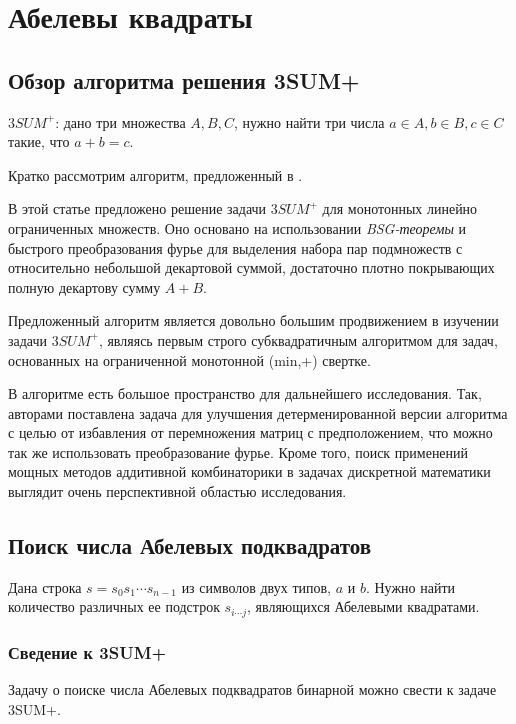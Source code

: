 \section{Абелевы квадраты}

\subsection{Обзор алгоритма решения 3SUM+}

\begin{problem}
$3SUM^+$: дано три множества $A, B, C$, нужно найти три числа $a \in A, b \in B, c \in C$ такие, что $a+b=c$.
\end{problem}


Кратко рассмотрим алгоритм, предложенный в \cite{2}. 

В этой статье предложено решение задачи $3SUM^+$ для монотонных линейно ограниченных множеств. Оно основано на использовании \textit{BSG-теоремы} и быстрого преобразования фурье для выделения набора пар подмножеств с относительно небольшой декартовой суммой, достаточно плотно покрывающих полную декартову сумму $A+B$.

Предложенный алгоритм является довольно большим продвижением в изучении задачи $3SUM^+$, являясь первым строго субквадратичным алгоритмом для задач, основанных на ограниченной монотонной (min,+) свертке.

В алгоритме есть большое пространство для дальнейшего исследования. Так, авторами поставлена задача для улучшения детерменированной версии алгоритма с целью от избавления от перемножения матриц с предположением, что можно так же использовать преобразование фурье. Кроме того, поиск применений мощных методов аддитивной комбинаторики в задачах дискретной математики выглядит очень перспективной областью исследования.

\subsection{Поиск числа Абелевых подквадратов}
\begin{problem}
Дана строка $s=s_0s_1 \cdots s_{n-1}$ из символов двух типов, $a$ и $b$. Нужно найти количество различных ее подстрок $s_{i \cdots j}$, являющихся Абелевыми квадратами.
\end{problem}

\subsubsection{Сведение к 3SUM+}
Задачу о поиске числа Абелевых подквадратов бинарной можно свести к задаче 3SUM+.

